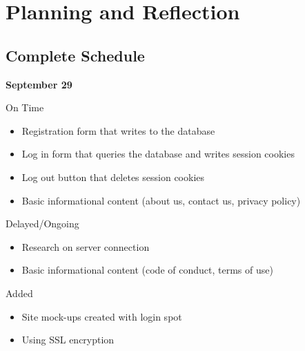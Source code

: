 
\section{Planning and Reflection}



		\subsection{Complete Schedule}
			\begin{description}
				\item \textbf{September 29}
				\begin{description}
					\item On Time
					\begin{itemize}
						\item Registration form that writes to the database
						\item Log in form that queries the database and writes session cookies
						\item Log out button that deletes session cookies
						\item Basic informational content (about us, contact us, privacy policy)
					\end{itemize}
					\item Delayed/Ongoing
					\begin{itemize}
						\item Research on server connection
						\item Basic informational content (code of conduct, terms of use)
					\end{itemize}
					\item Added
					\begin{itemize}
						\item Site mock-ups created with login spot
						\item Using SSL encryption
					\end{itemize}
				\end{description}


\end{description}
